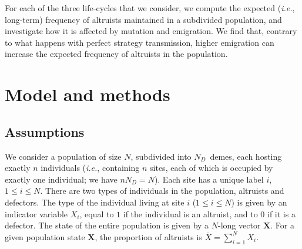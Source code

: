 \documentclass[11pt, letterpaper]{article}
\newcommand{\ie}{\textit{i.e.}}
\newcommand{\ndemes}{N_D}
\begin{document}
For each of the three life-cycles that we consider, we compute the expected (\ie, long-term) frequency of altruists maintained in a subdivided population, and investigate how it is affected by mutation and emigration. We find that, contrary to what happens with perfect strategy transmission, higher emigration can increase the expected frequency of altruists in the population. 




\section{Model and methods}

\subsection{Assumptions}

We consider a population of size $N$, subdivided into $\ndemes$~demes, each hosting exactly $n$ individuals (\ie, containing $n$ sites, each of which is occupied by exactly one individual; we have $n \ndemes = N$). Each site has a unique label $i$, $1\leq i \leq N$. There are two types of individuals in the population, altruists and defectors. The type of the individual living at site $i$ ($1\leq i \leq N$) is given by an indicator variable $X_i$, equal to $1$ if the individual is an altruist, and to $0$ if it is a defector. The state of the entire population is given by a $N$-long vector $\mathbf{X}$. For a given population state $\mathbf{X}$, the proportion of altruists is $\overline{X} = \sum_{i=1}^N X_i$. 
\end{document}
